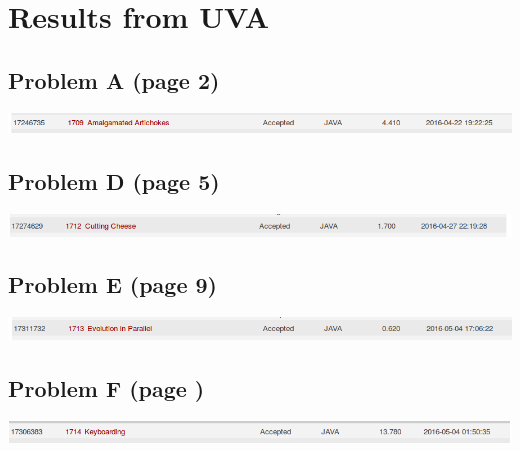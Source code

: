 \documentclass[12pt]{article}
\begin{document}

\newcommand{\hmwkClass}{COS 255}
\newcommand{\hmwkSemester}{Spring 2016}

\newcommand{\hmwkAuthorName}{Lukas Leung}
\newcommand{\hmwkAuthorID}{lleung}

\newcommand{\hmwkAssignmentNum}{9}

\newcommand{\hmwkProblemNum}{0}

\newcommand{\hmwkCollaborators}{}
\thispagestyle{fancycollab}

\section*{Results from UVA}
\subsection{Problem A (page 2)}
\includegraphics[width=\textwidth]{ProblemA}
\subsection{Problem D (page 5)}
\includegraphics[width=\textwidth]{ProblemD}
\subsection{Problem E (page 9)}
\includegraphics[width=\textwidth]{ProblemE}
\subsection{Problem F (page )}
\includegraphics[width=\textwidth]{ProblemF}
\newpage
\end{document}
